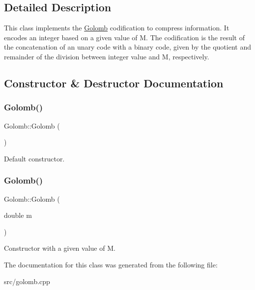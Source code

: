 \subsection{Detailed Description}
This class implements the \hyperlink{classGolomb}{Golomb} codification to compress information. It encodes an integer based on a given value of M. The codification is the result of the concatenation of an unary code with a binary code, given by the quotient and remainder of the division between integer value and M, respectively. 

\subsection{Constructor \& Destructor Documentation}
\mbox{\label{classGolomb_aa6103d56ebec9decc11a69bf6be83208}} 
\subsubsection{\texorpdfstring{Golomb()}{Golomb()}\hspace{0.1cm}{\footnotesize\ttfamily [1/2]}}
{\footnotesize\ttfamily Golomb\+::\+Golomb (\begin{DoxyParamCaption}{ }\end{DoxyParamCaption})\hspace{0.3cm}{\ttfamily [inline]}}

Default constructor. \mbox{\label{classGolomb_aca358c8c3c8706b470c74f64f9509a64}} 
\subsubsection{\texorpdfstring{Golomb()}{Golomb()}\hspace{0.1cm}{\footnotesize\ttfamily [2/2]}}
{\footnotesize\ttfamily Golomb\+::\+Golomb (\begin{DoxyParamCaption}\item[{double}]{m }\end{DoxyParamCaption})\hspace{0.3cm}{\ttfamily [inline]}}

Constructor with a given value of \textquotesingle{}M\textquotesingle{}. 

The documentation for this class was generated from the following file\+:\begin{DoxyCompactItemize}
\item 
src/golomb.\+cpp\end{DoxyCompactItemize}
